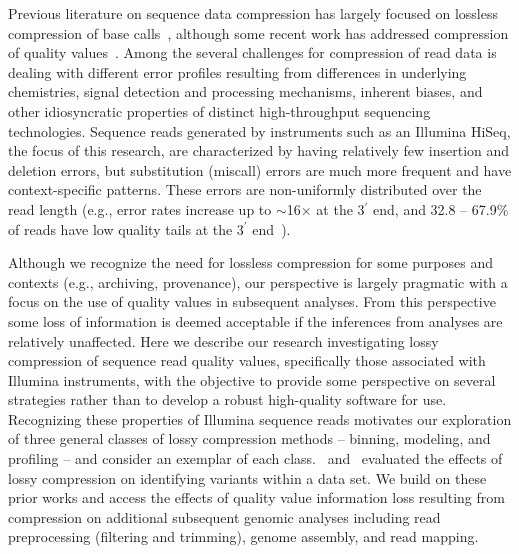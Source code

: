 \documentclass{bioinfo}
\begin{document}
Previous literature on sequence data compression has largely focused
on lossless compression of base calls~\cite[reviewed
  in][]{Deorowicz:2013hq,Giancarlo:2014rw,Giancarlo:2009fk,
  Nalbantoglu:2010uq,Zhu:2013qr}, although some recent work has
addressed compression of quality
values~\cite[e.g.,][]{asnani2012lossy,Canovas:2014fr,Hach:2012ys,
  janin2013adaptive,Kozanitis:2011kl,Ochoa:2013rt,Tembe:2010ys,
  Wan:2012kq,DBLP:conf/recomb/YuYB14,zhou2014compression}. Among the
several challenges for compression of read data is dealing with
different error profiles resulting from differences in underlying
chemistries, signal detection and processing mechanisms, inherent
biases, and other idiosyncratic properties of distinct high-throughput
sequencing technologies. Sequence reads generated by instruments such
as an Illumina HiSeq, the focus of this research, are characterized by
having relatively few insertion and deletion errors, but substitution
(miscall) errors are much more frequent and have context-specific
patterns. These errors are non-uniformly distributed over the read
length (e.g., error rates increase up to $\sim$16$\times$ at the
3$^{\prime}$ end, and 32.8 -- 67.9\% of reads have low quality tails
at the 3$^{\prime}$ end~\citep{Minoche:2011km}).

Although we recognize the need for lossless compression for some
purposes and contexts (e.g., archiving, provenance), our perspective
is largely pragmatic with a focus on the use of quality values in
subsequent analyses. From this perspective some loss of information is
deemed acceptable if the inferences from analyses are relatively
unaffected. Here we describe our research investigating lossy
compression of sequence read quality values, specifically those
associated with Illumina instruments, with the objective to provide
some perspective on several strategies rather than to develop a robust
high-quality software for use. Recognizing these properties of
Illumina sequence reads motivates our exploration of three general
classes of lossy compression methods -- binning, modeling, and
profiling -- and consider an exemplar of each class.~\cite{Canovas:2014fr} and~\cite{janin2013adaptive} evaluated the effects of lossy compression on identifying variants within a data set. We build on these prior works and access the effects of
quality value information loss resulting from compression on additional
subsequent genomic analyses including read preprocessing (filtering
and trimming), genome assembly, and read mapping.
\end{document}
